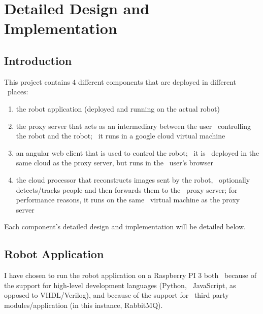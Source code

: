 \chapter{Detailed Design and Implementation}
\label{ch:implementation}



\section{Introduction}
\label{sec:implementation-introduction}
This project contains 4 different components that are deployed in different \
places:
\begin{enumerate}
    \item the robot application (deployed and running on the actual robot)
    \item the proxy server that acts as an intermediary between the user \
            controlling the robot and the robot; \
            it runs in a google cloud virtual machine
    \item an angular web client that is used to control the robot; \
            it is \
            deployed in the same cloud as the proxy server, but runs in the \
            user's browser
    \item the cloud processor that reconstructs images sent by the robot, \
            optionally detects/tracks people and then forwards them to the \
            proxy server; for performance reasons, it runs on the same \
            virtual machine as the proxy server
\end{enumerate}

Each component's detailed design and implementation will be detailed below.

\section{Robot Application}
\label{sec:robot-application}
I have chosen to run the robot application on a Raspberry PI 3 both \
because of the support for high-level development languages (Python, \
JavaScript, as opposed to VHDL/Verilog), and because of the support for \
third party modules/application (in this instance, RabbitMQ).


